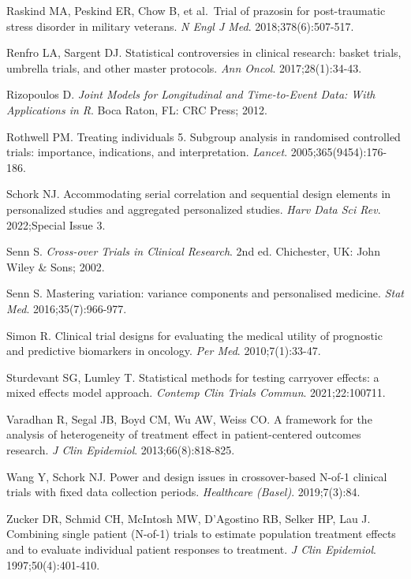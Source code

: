 \documentclass[
]{article}
\begin{document}
Raskind MA, Peskind ER, Chow B, et al.~Trial of prazosin for
post-traumatic stress disorder in military veterans.
\textit{N Engl J Med}. 2018;378(6):507-517.

Renfro LA, Sargent DJ. Statistical controversies in clinical
research: basket trials, umbrella trials, and other master
protocols. \textit{Ann Oncol}. 2017;28(1):34-43.

Rizopoulos D. \textit{Joint Models for Longitudinal and
Time-to-Event Data: With Applications in R}. Boca Raton, FL:
CRC Press; 2012.

Rothwell PM. Treating individuals 5. Subgroup analysis in
randomised controlled trials: importance, indications, and
interpretation. \textit{Lancet}. 2005;365(9454):176-186.

Schork NJ. Accommodating serial correlation and sequential
design elements in personalized studies and aggregated
personalized studies. \textit{Harv Data Sci Rev}. 2022;Special
Issue 3.

Senn S. \textit{Cross-over Trials in Clinical Research}. 2nd ed.
Chichester, UK: John Wiley \& Sons; 2002.

Senn S. Mastering variation: variance components and
personalised medicine. \textit{Stat Med}. 2016;35(7):966-977.

Simon R. Clinical trial designs for evaluating the medical
utility of prognostic and predictive biomarkers in oncology.
\textit{Per Med}. 2010;7(1):33-47.

Sturdevant SG, Lumley T. Statistical methods for testing
carryover effects: a mixed effects model approach.
\textit{Contemp Clin Trials Commun}. 2021;22:100711.

Varadhan R, Segal JB, Boyd CM, Wu AW, Weiss CO. A framework for
the analysis of heterogeneity of treatment effect in
patient-centered outcomes research. \textit{J Clin Epidemiol}.
2013;66(8):818-825.

Wang Y, Schork NJ. Power and design issues in crossover-based
N-of-1 clinical trials with fixed data collection periods.
\textit{Healthcare (Basel)}. 2019;7(3):84.

Zucker DR, Schmid CH, McIntosh MW, D'Agostino RB, Selker HP,
Lau J. Combining single patient (N-of-1) trials to estimate
population treatment effects and to evaluate individual patient
responses to treatment. \textit{J Clin Epidemiol}. 1997;50(4):401-410.
\end{document}
